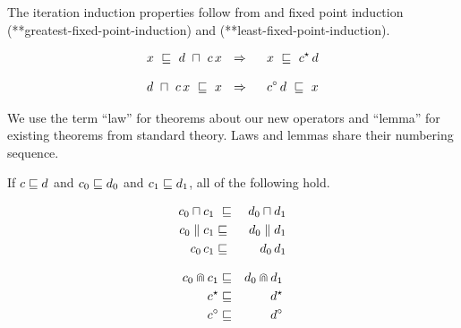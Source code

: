 \documentclass[fleqn]{fac}
\makeatletter
\def\refaxiom{\@ifnextchar*{\@refaxiom}{\@@refaxiom}}
\def\@refaxiom*#1{\ref{axiom-#1}\index{Axiom!#1|LawUse}}
\def\@@refaxiom#1{axiom~(\ref{axiom-#1})\index{Axiom!#1|LawUse}}
\newcommand{\labelproperty}[1]{\label{property-#1}\index{Property!#1|PropertyDef{\ref{property-#1}}}}
\newcommand{\SSeq}{\,}
\newcommand{\nondet}{\mathbin{\sqcap}}
\newcommand{\together}{\mathbin{\doublecap}}
\newcommand{\FinIter}{^{\star}}
\newcommand{\itkleene}[1]{#1^{\star}}
\newcommand{\FinOrInfIter}{^{\circ}}
\newcommand{\itomega}[1]{#1\FinOrInfIter}
\makeatother
\begin{document}
\begin{lemmax}[induction]
The iteration induction properties follow from  and 
fixed point induction (\refaxiom*{greatest-fixed-point-induction})  and (\refaxiom*{least-fixed-point-induction}).
\\[-1ex]
\begin{minipage}{0.5\textwidth}
\begin{eqnarray}
  x ~\refsto~  d ~\nondet~ c \SSeq x & ~~\implies~~ & x ~\refsto~ \itkleene{c} \SSeq d
    \labelproperty{kleene-induction}
\end{eqnarray}
\end{minipage}
\begin{minipage}{0.49\textwidth}
\begin{eqnarray}
  d ~\nondet~ c \SSeq x ~\refsto~ x & ~~\implies~~ & \itomega{c} \SSeq d ~\refsto~ x 
    \labelproperty{omega-induction} 
\end{eqnarray}
\end{minipage}
\end{lemmax}
We use the term 
``law'' for theorems about our new operators
and 
``lemma'' for existing theorems from standard theory.
Laws and lemmas share their numbering sequence.
\begin{lawx}[monotonic]
If $c \mathrel{\sqsubseteq} d$ and $c_0 \mathrel{\sqsubseteq} d_0$ and $c_1 \mathrel{\sqsubseteq} d_1$,
all of the following hold. \\[-1ex]
\begin{minipage}{0.5\textwidth}
\begin{eqnarray}
  c_0 \nondet c_1 & ~\refsto~ & d_0 \nondet d_1 
    \labelproperty{nondet-monotonic} \\
  c_0 \parallel c_1 & \refsto & d_0 \parallel d_1
    \labelproperty{parallel-monotonic} \\
  c_0 \SSeq c_1 & \refsto & d_0 \SSeq d_1
    \labelproperty{sequential-monotonic}
\end{eqnarray}
\end{minipage}
\begin{minipage}{0.49\textwidth}
\begin{eqnarray}
  c_0 \together c_1 & \refsto & d_0 \together d_1
    \labelproperty{conjunction-monotonic} \\
  c\FinIter & \refsto & d\FinIter  
    \labelproperty{kleene-monotonic} \\
  c\FinOrInfIter & \refsto & d\FinOrInfIter 
    \labelproperty{omega-monotonic}
\end{eqnarray}
\end{minipage}
\end{lawx}
\end{document}
